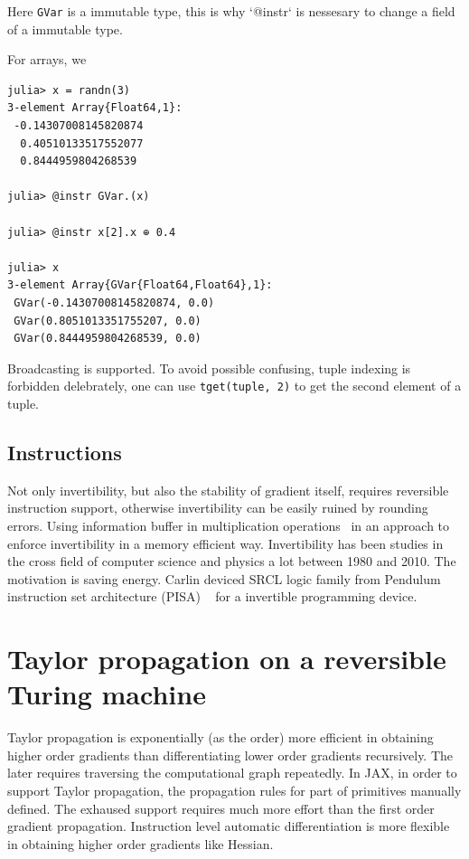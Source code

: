 \documentclass[aps,twocolumn,longbibliography,english,superscriptaddress,prr]{revtex4-1}
\newcommand{\<}{\langle}
\renewcommand{\>}{\rangle}
\begin{document}
Here \texttt{GVar} is a immutable type, this is why `@instr` is nessesary to change a field of a immutable type.

For arrays, we 

\begin{minipage}{.44\textwidth}
\begin{lstlisting}
julia> x = randn(3)
3-element Array{Float64,1}:
 -0.14307008145820874
  0.40510133517552077
  0.8444959804268539 

julia> @instr GVar.(x)

julia> @instr x[2].x ⊕ 0.4

julia> x
3-element Array{GVar{Float64,Float64},1}:
 GVar(-0.14307008145820874, 0.0)
 GVar(0.8051013351755207, 0.0)  
 GVar(0.8444959804268539, 0.0)
\end{lstlisting}
\end{minipage}

Broadcasting is supported. To avoid possible confusing, tuple indexing is forbidden delebrately, one can use \texttt{tget(tuple, 2)} to get the second element of a tuple.

\subsection{Instructions}
Not only invertibility, but also the stability of gradient itself, requires reversible instruction support, otherwise invertibility can be easily ruined by rounding errors.
Using information buffer in multiplication operations~\cite{Maclaurin2015} in an approach to enforce invertibility in a memory efficient way.
Invertibility has been studies in the cross field of computer science and physics a lot between 1980 and 2010.
The motivation is saving energy.
Carlin deviced SRCL logic family from Pendulum instruction set architecture (PISA) ~\cite{Vieri1999} for a invertible programming device.

\section{Taylor propagation on a reversible Turing machine}
Taylor propagation is exponentially (as the order) more efficient in obtaining higher order gradients than differentiating lower order gradients recursively.
The later requires traversing the computational graph repeatedly.
In JAX, in order to support Taylor propagation, the propagation rules for part of primitives manually defined.
The exhaused support requires much more effort than the first order gradient propagation.
Instruction level automatic differentiation is more flexible in obtaining higher order gradients like Hessian.
\end{document}
